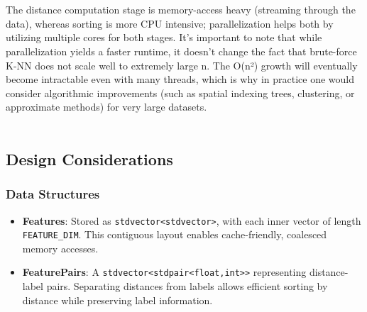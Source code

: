 \parencite{article}
\\\\
The distance computation stage is memory-access heavy (streaming through the data), whereas sorting is more CPU intensive; parallelization helps both by utilizing multiple cores for both stages. It's important to note that while parallelization yields a faster runtime, it doesn’t change the fact that brute-force K-NN does not scale well to extremely large n. The O(n²) growth will eventually become intractable even with many threads, which is why in practice one would consider algorithmic improvements (such as spatial indexing trees, clustering, or approximate methods) for very large datasets. \parencite{intel2020quicksort}
\\\\

\subsection{Design Considerations}
\subsubsection{Data Structures}
\begin{itemize}
\item \textbf{Features}: Stored as \texttt{std\:\:vector<std\:\:vector>}, with each inner vector of length \texttt{FEATURE\_DIM}. This contiguous layout enables cache-friendly, coalesced memory accesses.
\item \textbf{FeaturePairs}: A \texttt{std\:\:vector<std\:\:pair<float,int>>} representing distance-label pairs.  Separating distances from labels allows efficient sorting by distance while preserving label information.
\end{itemize}

